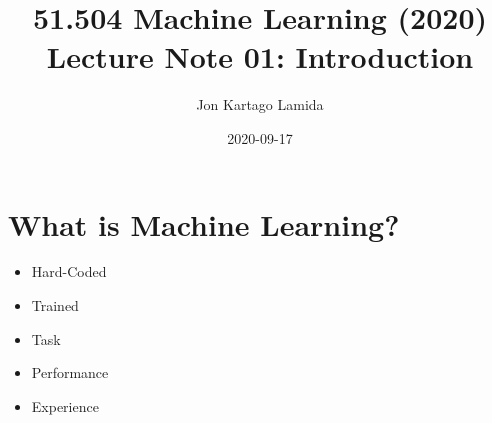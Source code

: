 \documentclass[12pt, a4paper]{article}
\title{%
51.504 Machine Learning (2020) \\
Lecture Note 01: Introduction}
\date{2020-09-17}
\author{%
Jon Kartago Lamida}
\begin{document}
  \maketitle
  \setlength{\parindent}{0pt}

\section*{What is Machine Learning?}
\begin{itemize}
  \item Hard-Coded
  \item Trained
\end{itemize}
\begin{itemize}
  \item Task
  \item Performance
  \item Experience
\end{itemize}
\end{document}
